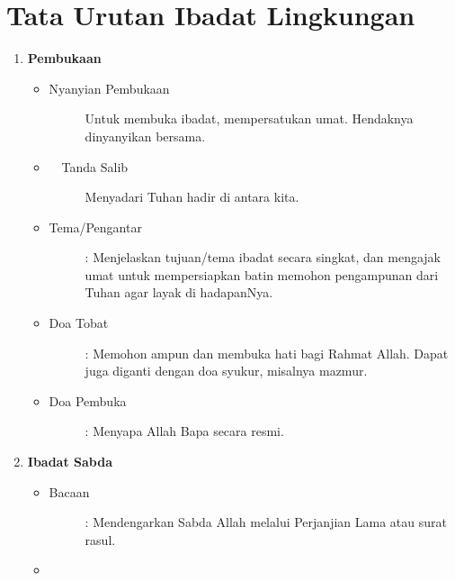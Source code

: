 \section{Tata Urutan Ibadat Lingkungan} 

\begin{enumerate}
\item {\large \textbf{Pembukaan}}
\begin{itemize}
\item \begin{description}
\item[Nyanyian Pembukaan]
Untuk membuka ibadat, mempersatukan umat. Hendaknya dinyanyikan bersama.
\end{description}

\item \begin{description}
\item[\Cross ~~Tanda Salib]
Menyadari Tuhan hadir di antara kita.
\end{description}

\item \begin{description}
\item[Tema/Pengantar]: Menjelaskan tujuan/tema ibadat secara singkat, dan
mengajak umat untuk mempersiapkan batin memohon pengampunan dari Tuhan
agar layak di hadapanNya.
\end{description}
\item \begin{description}
\item [Doa Tobat]: Memohon ampun dan membuka hati bagi Rahmat Allah. Dapat
juga diganti dengan doa syukur, misalnya mazmur.
\end{description}

\item \begin{description}
\item [Doa Pembuka]: Menyapa Allah Bapa secara resmi.
\end{description}
\end{itemize}

\item {\large \textbf{Ibadat Sabda}}
\begin{itemize}

\item \begin{description}
\item[Bacaan] : Mendengarkan Sabda Allah melalui Perjanjian Lama atau
surat rasul.
\end{description}
\item \begin{description}


\end{description}
\end{itemize}
\end{enumerate}
